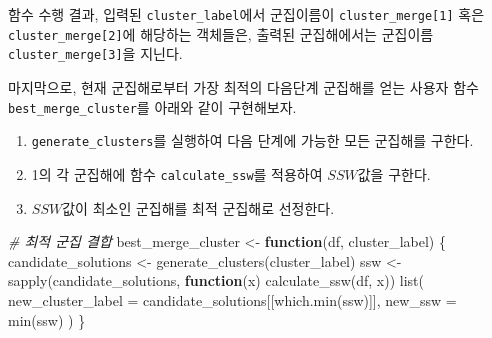 \documentclass[
]{book}
\newenvironment{Shaded}{\begin{snugshade}}{\end{snugshade}}
\newcommand{\AttributeTok}[1]{\textcolor[rgb]{0.77,0.63,0.00}{#1}}
\newcommand{\CommentTok}[1]{\textcolor[rgb]{0.56,0.35,0.01}{\textit{#1}}}
\newcommand{\ControlFlowTok}[1]{\textcolor[rgb]{0.13,0.29,0.53}{\textbf{#1}}}
\newcommand{\DecValTok}[1]{\textcolor[rgb]{0.00,0.00,0.81}{#1}}
\newcommand{\FunctionTok}[1]{\textcolor[rgb]{0.00,0.00,0.00}{#1}}
\newcommand{\NormalTok}[1]{#1}
\newcommand{\OtherTok}[1]{\textcolor[rgb]{0.56,0.35,0.01}{#1}}
\newcommand{\SpecialCharTok}[1]{\textcolor[rgb]{0.00,0.00,0.00}{#1}}
\newcommand{\StringTok}[1]{\textcolor[rgb]{0.31,0.60,0.02}{#1}}
\providecommand{\tightlist}{%
  \setlength{\itemsep}{0pt}\setlength{\parskip}{0pt}}
\begin{document}
함수 수행 결과, 입력된 \texttt{cluster\_label}에서 군집이름이 \texttt{cluster\_merge{[}1{]}} 혹은 \texttt{cluster\_merge{[}2{]}}에 해당하는 객체들은, 출력된 군집해에서는 군집이름 \texttt{cluster\_merge{[}3{]}}을 지닌다.

\begin{Shaded}
\end{Shaded}

마지막으로, 현재 군집해로부터 가장 최적의 다음단계 군집해를 얻는 사용자 함수 \texttt{best\_merge\_cluster}를 아래와 같이 구현해보자.

\begin{enumerate}
\def\labelenumi{\arabic{enumi}.}
\tightlist
\item
  \texttt{generate\_clusters}를 실행하여 다음 단계에 가능한 모든 군집해를 구한다.
\item
  1의 각 군집해에 함수 \texttt{calculate\_ssw}를 적용하여 \(SSW\)값을 구한다.
\item
  \(SSW\)값이 최소인 군집해를 최적 군집해로 선정한다.
\end{enumerate}

\begin{Shaded}
\begin{Highlighting}[]
\CommentTok{\# 최적 군집 결합}
\NormalTok{best\_merge\_cluster }\OtherTok{\textless{}{-}} \ControlFlowTok{function}\NormalTok{(df, cluster\_label) \{}
\NormalTok{  candidate\_solutions }\OtherTok{\textless{}{-}} \FunctionTok{generate\_clusters}\NormalTok{(cluster\_label)}
\NormalTok{  ssw }\OtherTok{\textless{}{-}} \FunctionTok{sapply}\NormalTok{(candidate\_solutions, }\ControlFlowTok{function}\NormalTok{(x) }\FunctionTok{calculate\_ssw}\NormalTok{(df, x))}
  \FunctionTok{list}\NormalTok{(}
    \AttributeTok{new\_cluster\_label =}\NormalTok{ candidate\_solutions[[}\FunctionTok{which.min}\NormalTok{(ssw)]],}
    \AttributeTok{new\_ssw =} \FunctionTok{min}\NormalTok{(ssw)}
\NormalTok{  )}
\NormalTok{\}}
\end{Highlighting}
\end{Shaded}
\end{document}
